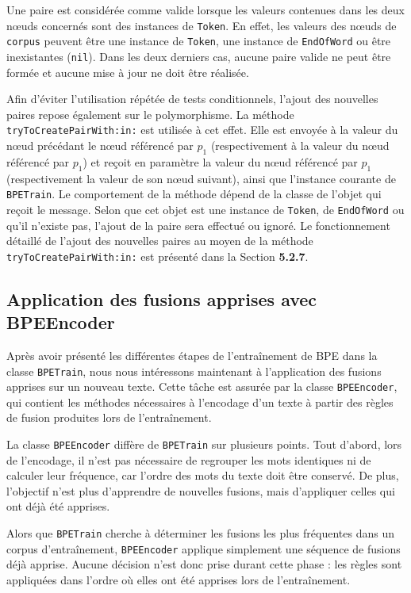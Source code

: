 \documentclass[12pt,a4paper]{report}
\begin{document}
	Une paire est considérée comme valide lorsque les valeurs contenues dans les deux nœuds concernés sont des instances de \texttt{Token}. En effet, les valeurs des nœuds de \texttt{corpus} peuvent être une instance de \texttt{Token}, une instance de \texttt{EndOfWord} ou être inexistantes (\texttt{nil}). Dans les deux derniers cas, aucune paire valide ne peut être formée et aucune mise à jour ne doit être réalisée.
	
	Afin d’éviter l’utilisation répétée de tests conditionnels, l’ajout des nouvelles paires repose également sur le polymorphisme. La méthode \texttt{tryToCreatePairWith:in:} est utilisée à cet effet. Elle est envoyée à la valeur du nœud précédant le nœud référencé par $p_1$ (respectivement à la valeur du nœud référencé par $p_1$) et reçoit en paramètre la valeur du nœud référencé par $p_1$ (respectivement la valeur de son nœud suivant), ainsi que l’instance courante de \texttt{BPETrain}.
	Le comportement de la méthode dépend de la classe de l’objet qui reçoit le message. Selon que cet objet est une instance de \texttt{Token}, de \texttt{EndOfWord} ou qu’il n’existe pas, l’ajout de la paire sera effectué ou ignoré.
	Le fonctionnement détaillé de l’ajout des nouvelles paires au moyen de la méthode \texttt{tryToCreatePairWith:in:} est présenté dans la Section \textbf{5.2.7}.
	
	\subsection{Application des fusions apprises avec BPEEncoder}
	
	Après avoir présenté les différentes étapes de l'entraînement de BPE dans la classe \texttt{BPETrain}, nous nous intéressons maintenant à l'application des fusions apprises sur un nouveau texte. Cette tâche est assurée par la classe \texttt{BPEEncoder}, qui contient les méthodes nécessaires à l'encodage d'un texte à partir des règles de fusion produites lors de l'entraînement.
	
	La classe \texttt{BPEEncoder} diffère de \texttt{BPETrain} sur plusieurs points. Tout d'abord, lors de l'encodage, il n'est pas nécessaire de regrouper les mots identiques ni de calculer leur fréquence, car l'ordre des mots du texte doit être conservé. De plus, l'objectif n'est plus d'apprendre de nouvelles fusions, mais d'appliquer celles qui ont déjà été apprises.
	
	Alors que \texttt{BPETrain} cherche à déterminer les fusions les plus fréquentes dans un corpus d'entraînement, \texttt{BPEEncoder} applique simplement une séquence de fusions déjà apprise. Aucune décision n'est donc prise durant cette phase : les règles sont appliquées dans l'ordre où elles ont été apprises lors de l'entraînement.
	
\end{document}
